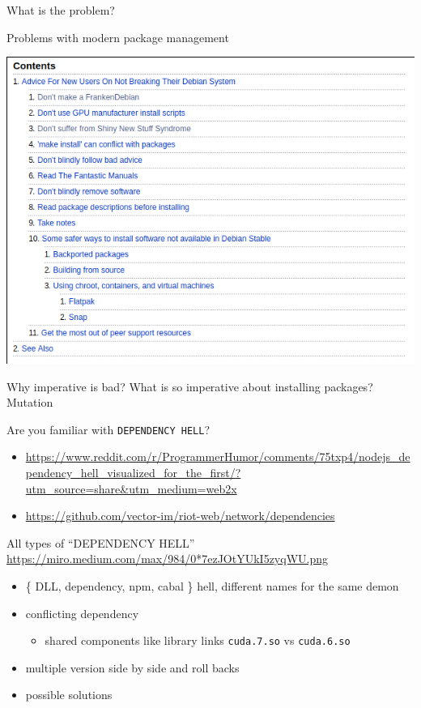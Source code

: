 \documentclass[presentation]{beamer}
\begin{document}
\begin{frame}[label={sec:org38cfab4},fragile]{What is the problem?}
\begin{block}{Problems with modern package management}
\begin{center}
\includegraphics[width=.9\linewidth]{./images/screenshot-01.png}
\end{center}
\end{block}
\begin{block}{Why imperative is bad? What is so imperative about installing packages?}
Mutation
\end{block}
\begin{block}{Are you familiar with \texttt{DEPENDENCY HELL}?}
\begin{itemize}
\item \url{https://www.reddit.com/r/ProgrammerHumor/comments/75txp4/nodejs\_dependency\_hell\_visualized\_for\_the\_first/?utm\_source=share\&utm\_medium=web2x}
\item \url{https://github.com/vector-im/riot-web/network/dependencies}
\end{itemize}
\end{block}
\begin{block}{All types of ``DEPENDENCY HELL''}
\url{https://miro.medium.com/max/984/0*7ezJOtYUkI5zyqWU.png}
\begin{itemize}
\item \{ DLL, dependency, npm, cabal \} hell, different names for the same demon
\item conflicting dependency
\begin{itemize}
\item shared components like library links \texttt{cuda.7.so} vs \texttt{cuda.6.so}
\end{itemize}
\item multiple version side by side and roll backs
\item possible solutions

\end{itemize}
\end{block}
\end{frame}
\end{document}
